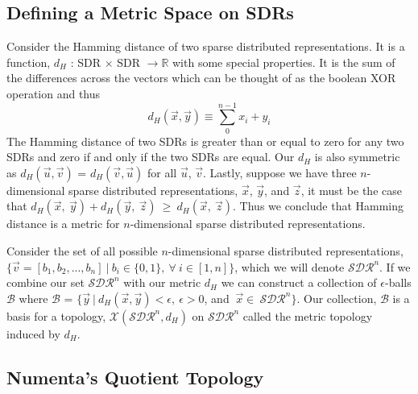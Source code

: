 \documentclass[fleqn,minimal]{article}
\begin{document}
	
	\subsection{Defining a Metric Space on SDRs}
	
	Consider the Hamming distance of two sparse distributed representations. It is a function, $d_{H}$ : SDR $\times$ SDR $\longrightarrow \mathbb{R}$ with some special properties. It is the sum of the differences across the vectors which can be thought of as the boolean XOR operation and thus $$d_{H}(\overrightarrow{x}, \overrightarrow{y})  \equiv \sum_{0}^{n-1} x_{i}+y_{i}$$ The Hamming distance of two SDRs is greater than or equal to zero for any two SDRs and zero if and only if the two SDRs are equal. Our $d_{H}$ is also symmetric as $d_{H}(\overrightarrow{u},\overrightarrow{v})$ = $d_{H}(\overrightarrow{v}, \overrightarrow{u})$ for all $\overrightarrow{u}$, $\overrightarrow{v}$. Lastly, suppose we have three $n$-dimensional sparse distributed representations, $\overrightarrow{x}$, $\overrightarrow{y}$, and $\overrightarrow{z}$, it must be the case that $d_{H}(\overrightarrow{x}, \ \overrightarrow{y}) + d_{H}(\overrightarrow{y}, \ \overrightarrow{z}) \: \geq \: d_{H}(\overrightarrow{x}, \ \overrightarrow{z})$. Thus we conclude that Hamming distance is a metric for $n$-dimensional sparse distributed representations. 	
	  
	Consider the set of all possible $n$-dimensional sparse distributed representations, $\{\overrightarrow{v} = [b_{1}, b_{2}, ..., b_{n}] \:| \: b_{i} \in \{0,1\}, \: \forall \: i \in [1,n] \}$, which we will denote $\mathcal{SDR}^{n}$. If we combine our set  $\mathcal{SDR}^{n}$ with our metric $d_{H}$ we can construct a collection of $\epsilon$-balls $\mathcal{B}$ where $\mathcal{B}$ = $\{\overrightarrow{y} \ | \ d_{H}(\overrightarrow{x}, \overrightarrow{y}) < \epsilon, \: \epsilon > 0$, and $\: \overrightarrow{x} \in \ \mathcal{SDR}^{n}\}$. Our collection, $\mathcal{B}$ is a basis for a topology, $\mathcal{X}(\mathcal{SDR}^{n}, d_{H})$ on $\mathcal{SDR}^{n}$ called the metric topology induced by $d_{H}$.
	
	\subsection{Numenta's Quotient Topology}
	
\end{document}
